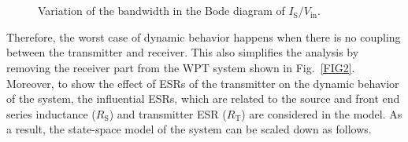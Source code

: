 \documentclass[journal,a4paper,10pt,twoside]{IEEEtran} %
\begin{document}
	\begin{figure}
	    \begin{center}
        \\
	    \vspace{-3mm}
	    \\
	    \vspace{-3mm}
	    \end{center}
	    \caption{Variation of the bandwidth in the Bode diagram of ${{I}_{\mathrm{S}}}/{{V}_{\mathrm{in}}}$.}
	    \label{FIG5}
	    \vspace{-3mm}
	\end{figure}
	
	Therefore, the worst case of dynamic behavior happens when there is no coupling between the transmitter and receiver. This also simplifies the analysis by removing the receiver part from the WPT system shown in Fig.~\ref{FIG2}. Moreover, to show the effect of ESRs of the transmitter on the dynamic behavior of the system, the influential ESRs, which are related to the source and front end series inductance ($R_\mathrm{S}$) and transmitter ESR ($R_\mathrm{T}$) are considered in the model. As a result, the state-space model of the system can be scaled down as follows.
	
\end{document}
